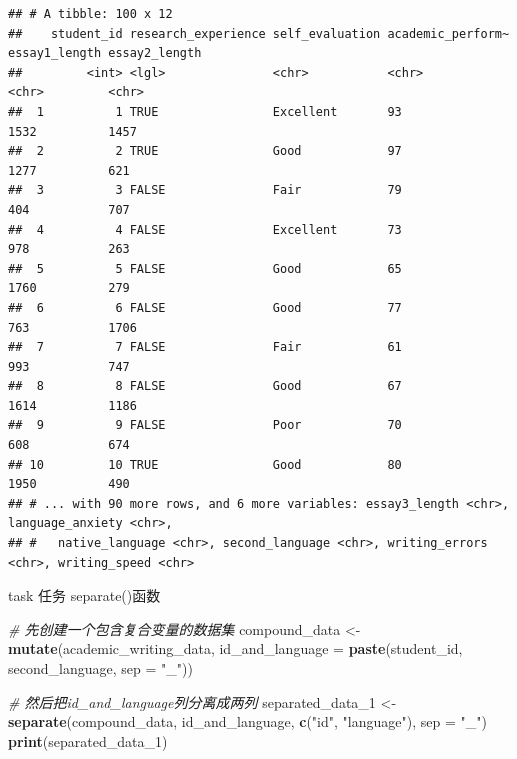 \documentclass[]{book}
\newenvironment{Shaded}{\begin{snugshade}}{\end{snugshade}}
\newcommand{\CommentTok}[1]{\textcolor[rgb]{0.56,0.35,0.01}{\textit{#1}}}
\newcommand{\DataTypeTok}[1]{\textcolor[rgb]{0.13,0.29,0.53}{#1}}
\newcommand{\DecValTok}[1]{\textcolor[rgb]{0.00,0.00,0.81}{#1}}
\newcommand{\KeywordTok}[1]{\textcolor[rgb]{0.13,0.29,0.53}{\textbf{#1}}}
\newcommand{\NormalTok}[1]{#1}
\newcommand{\StringTok}[1]{\textcolor[rgb]{0.31,0.60,0.02}{#1}}
\begin{document}
\begin{verbatim}
## # A tibble: 100 x 12
##    student_id research_experience self_evaluation academic_perform~ essay1_length essay2_length
##         <int> <lgl>               <chr>           <chr>             <chr>         <chr>
##  1          1 TRUE                Excellent       93                1532          1457
##  2          2 TRUE                Good            97                1277          621
##  3          3 FALSE               Fair            79                404           707
##  4          4 FALSE               Excellent       73                978           263
##  5          5 FALSE               Good            65                1760          279
##  6          6 FALSE               Good            77                763           1706
##  7          7 FALSE               Fair            61                993           747
##  8          8 FALSE               Good            67                1614          1186
##  9          9 FALSE               Poor            70                608           674
## 10         10 TRUE                Good            80                1950          490
## # ... with 90 more rows, and 6 more variables: essay3_length <chr>, language_anxiety <chr>,
## #   native_language <chr>, second_language <chr>, writing_errors <chr>, writing_speed <chr>
\end{verbatim}

\begin{infobox}task
任务
separate()函数

\end{infobox}

\begin{Shaded}
\begin{Highlighting}[]
\CommentTok{# 先创建一个包含复合变量的数据集}
\NormalTok{compound_data <-}\StringTok{ }\KeywordTok{mutate}\NormalTok{(academic_writing_data, }\DataTypeTok{id_and_language =} \KeywordTok{paste}\NormalTok{(student_id, second_language, }\DataTypeTok{sep =} \StringTok{"_"}\NormalTok{))}

\CommentTok{# 然后把id_and_language列分离成两列}
\NormalTok{separated_data_}\DecValTok{1}\NormalTok{ <-}\StringTok{ }\KeywordTok{separate}\NormalTok{(compound_data, id_and_language, }\KeywordTok{c}\NormalTok{(}\StringTok{"id"}\NormalTok{, }\StringTok{"language"}\NormalTok{), }\DataTypeTok{sep =} \StringTok{"_"}\NormalTok{)}
\KeywordTok{print}\NormalTok{(separated_data_}\DecValTok{1}\NormalTok{)}
\end{Highlighting}
\end{Shaded}
\end{document}
